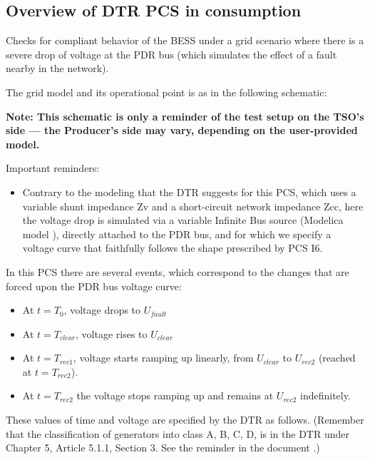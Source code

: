     \subsection{Overview of DTR PCS \DTRPcs{} in consumption}

    Checks for compliant behavior of the BESS under a grid scenario where there is a
    severe drop of voltage at the PDR bus (which simulates the effect of a fault
    nearby in the network).

    The grid model and its operational point is as in the following schematic:
    \begin{center}
        
    \end{center}
    \begin{center}
        \small \textbf{Note: This schematic is only a reminder of the test setup on the TSO's
        side --- the Producer's side may vary, depending on the user-provided model.}
    \end{center}

    \noindent Important reminders:
    \begin{itemize}
        \item Contrary to the modeling that the DTR suggests for this PCS, which uses a
        variable shunt impedance Zv and a short-circuit network impedance Zcc, here
        the voltage drop is simulated via a variable Infinite Bus source (Modelica
        model ), directly attached to the PDR bus, and for
        which we specify a voltage curve that faithfully follows the shape prescribed
        by PCS I6.
    \end{itemize}

    In this PCS there are several events, which correspond to the changes that are
    forced upon the PDR bus voltage curve:
    \begin{itemize}
        \item At $t = T_{0}$, voltage drops to $U_{fault}$
        \item At $t = T_{clear}$, voltage rises to $U_{clear}$
        \item At $t = T_{rec1}$, voltage starts ramping up linearly, from $U_{clear}$ to
        $U_{rec2}$ (reached at $t = T_{rec2}$).
        \item At $t = T_{rec2}$ the voltage stops ramping up and remains at $U_{rec2}$
        indefinitely.
    \end{itemize}
    These values of time and voltage are specified by the DTR as follows. (Remember
    that the classification of generators into class A, B, C, D, is in the DTR under
    Chapter 5, Article 5.1.1, Section 3. See the reminder in the document
    .)


